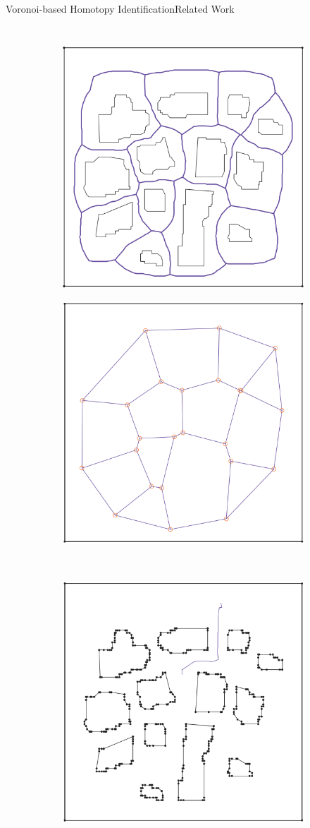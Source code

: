 \begin{frame}{Voronoi-based Homotopy Identification}{Related Work}

\begin{columns}

\begin{figure}
\begin{subfigure}
	\centering
	\includegraphics[width=.49\linewidth]{figure/voronoi_homotopy1}
\end{subfigure}
\begin{subfigure}
	\centering
	\includegraphics[width=.49\linewidth]{figure/voronoi_homotopy2}
\end{subfigure}
\\
\begin{subfigure}
	\centering
	\includegraphics[width=.49\linewidth]{figure/voronoi_homotopy3}

\end{subfigure}
\end{figure}
\end{columns}
\end{frame}
